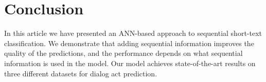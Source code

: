 \documentclass[11pt,letterpaper]{article}
\begin{document}
 \vspace{-0.3cm}








 
\section{Conclusion}

In this article we have presented an ANN-based approach to sequential short-text classification. We demonstrate that adding sequential information improves the quality of the predictions, and the performance depends on what sequential information is used in the model.
Our model achieves state-of-the-art results on three different datasets for dialog act prediction.





 
\newpage


\end{document}
